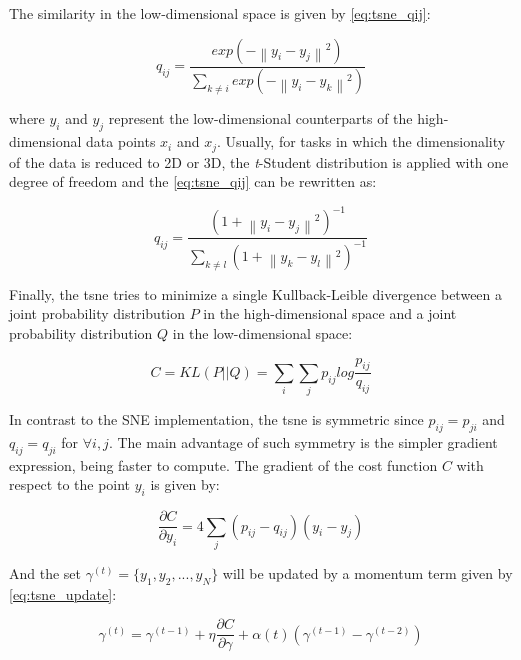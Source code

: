 The similarity in the low-dimensional space is given by \autoref{eq:tsne_qij}:

\begin{equation}
\label{eq:tsne_qij}
q_{ij} = \frac{exp(-\left\| y_i - y_j \right\|^2)}{\sum_{k \neq i} exp(-\left\| y_i - y_k \right\|^2)}
\end{equation}

\noindent
where $y_i$ and $y_j$ represent the low-dimensional counterparts of the
high-dimensional data points $x_i$ and $x_j$. Usually, for tasks in which the dimensionality of the data is reduced to 2D or 3D, the \textit{t}-Student distribution is applied with one degree of freedom and the \autoref{eq:tsne_qij} can be rewritten as:

\begin{equation}
\label{eq:tsne_qij_1}
q_{ij} = \frac{(1 +\left\| y_i - y_j \right\|^2)^{-1}}{\sum_{k \neq l} (1 +\left\| y_k - y_l \right\|^2)^{-1}}
\end{equation}

Finally, the \acs{tsne} tries to minimize a single Kullback-Leible divergence between a joint probability distribution $P$ in the high-dimensional space and a joint probability distribution $Q$ in the low-dimensional space:

\begin{equation}
\label{eq:tsne_cost}
C = KL(P||Q) = \sum_i\sum_j p_{ij} log \frac{p_{ij}}{q_{ij}}
\end{equation}

In contrast to the SNE implementation, the \acs{tsne} is symmetric since $p_{ij} = p_{ji}$ and $q_{ij} = q_{ji}$ for $\forall i,j$. The main advantage of such symmetry is the simpler gradient expression, being faster to compute. The gradient of the cost function $C$ with respect to the point $y_i$ is given by:

\begin{equation}
\label{eq:tsne_grad}
\frac{\partial C}{\partial y_i} = 4 \sum_j (p_{ij} - q_{ij})(y_i - y_j)
\end{equation}

And the set $\gamma^{(t)} = \{y_1, y_2, ..., y_N\}$ will be updated by a momentum term given by \autoref{eq:tsne_update}:

\begin{equation}
\label{eq:tsne_update}
\gamma^{(t)} = \gamma^{(t-1)} + \eta\frac{\partial C}{\partial \gamma} + \alpha(t)(\gamma^{(t-1)} - \gamma^{(t-2)})
\end{equation}

